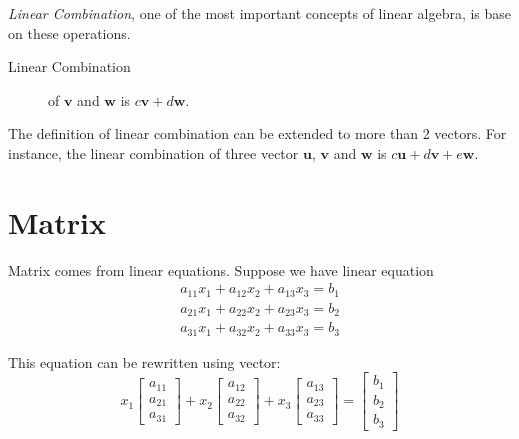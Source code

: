 \documentclass{article}
\newcommand{\vecs}[1]{\boldsymbol{#1}}
\begin{document}
    \emph{Linear Combination}, one of the most important concepts of linear algebra, is base on these operations.
    
    \begin{description}
        \item[Linear Combination] of $\vecs{v}$ and $\vecs{w}$ is $c\vecs{v}+d\vecs{w}$. 
    \end{description}

    The definition of linear combination can be extended to more than 2 vectors. For instance, the linear combination of three vector $\vecs{u}$, $\vecs{v}$ and $\vecs{w}$ is $c\vecs{u}+d\vecs{v}+e\vecs{w}$.

    \section{Matrix}

    Matrix comes from linear equations. Suppose we have linear equation
    \begin{equation*}
        \begin{split}
        a_{11}x_1+a_{12}x_2+a_{13}x_3=b_1\\
        a_{21}x_1+a_{22}x_2+a_{23}x_3=b_2\\
        a_{31}x_1+a_{32}x_2+a_{33}x_3=b_3
        \end{split}\tag{$*$}
    \end{equation*}

    This equation can be rewritten using vector:
    \begin{equation*}
        x_1\begin{bmatrix}a_{11}\\a_{21}\\a_{31}\end{bmatrix}+
        x_2\begin{bmatrix}a_{12}\\a_{22}\\a_{32}\end{bmatrix}+
        x_3\begin{bmatrix}a_{13}\\a_{23}\\a_{33}\end{bmatrix}=
        \begin{bmatrix}b_1\\b_2\\b_3\end{bmatrix}
    \end{equation*}
\end{document}
